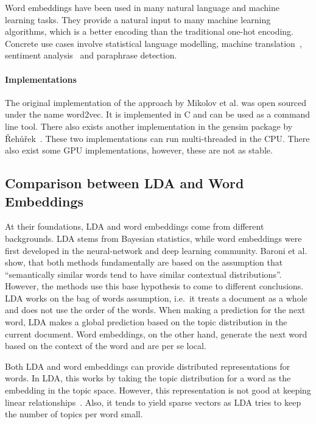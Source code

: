 \documentclass{sig-alternate-05-2015}
\begin{document}
Word embeddings have been used in many natural language and machine learning tasks.
They provide a natural input to many machine learning algorithms, which is a better encoding than the traditional one-hot encoding.
Concrete use cases involve statistical language modelling, machine translation~\cite{Zou2013}, sentiment analysis~\cite{Maas2011} and paraphrase detection.

\paragraph{Implementations}
The original implementation of the approach by Mikolov et al. was open sourced under the name word2vec.
It is implemented in C and can be used as a command line tool.
There also exists another implementation in the gensim package by {\v R}eh{\r u}{\v r}ek~\cite{Rehurek2010}.
These two implementations can run multi-threaded in the CPU.
There also exist some GPU implementations, however, these are not as stable.

\subsection{Comparison between LDA and Word Embeddings}

At their foundations, LDA and word embeddings come from different backgrounds.
LDA stems from Bayesian statistics, while word embeddings were first developed in the neural-network and deep learning community.
Baroni et al.~\cite{Baroni2014} show, that both methods fundamentally are based on the assumption that ``semantically similar words tend to have similar contextual distributions''.
However, the methods use this base hypothesis to come to different conclusions.
LDA works on the bag of words assumption, i.e.\ it treats a document as a whole and does not use the order of the words.
When making a prediction for the next word, LDA makes a global prediction based on the topic distribution in the current document.
Word embeddings, on the other hand, generate the next word based on the context of the word and are per se local.

Both LDA and word embeddings can provide distributed representations for words.
In LDA, this works by taking the topic distribution for a word as the embedding in the topic space.
However, this representation is not good at keeping linear relationships~\cite{Mikolov2013b,Mikolov2013a}.
Also, it tends to yield sparse vectors as LDA tries to keep the number of topics per word small.
\end{document}
